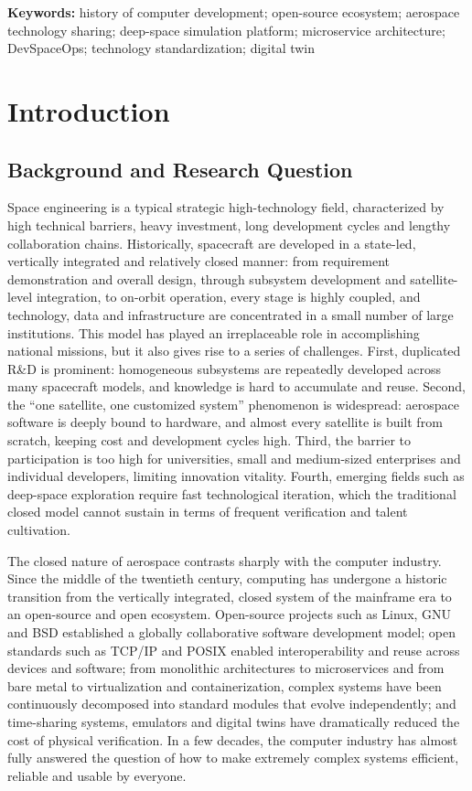 \documentclass[11pt]{article}
\begin{document}
\noindent\textbf{Keywords:} history of computer development; open-source ecosystem; aerospace technology sharing; deep-space simulation platform; microservice architecture; DevSpaceOps; technology standardization; digital twin

\section{Introduction}
\subsection{Background and Research Question}
Space engineering is a typical strategic high-technology field, characterized by high technical barriers, heavy investment, long development cycles and lengthy collaboration chains. Historically, spacecraft are developed in a state-led, vertically integrated and relatively closed manner: from requirement demonstration and overall design, through subsystem development and satellite-level integration, to on-orbit operation, every stage is highly coupled, and technology, data and infrastructure are concentrated in a small number of large institutions. This model has played an irreplaceable role in accomplishing national missions, but it also gives rise to a series of challenges. First, duplicated R\&D is prominent: homogeneous subsystems are repeatedly developed across many spacecraft models, and knowledge is hard to accumulate and reuse. Second, the ``one satellite, one customized system'' phenomenon is widespread: aerospace software is deeply bound to hardware, and almost every satellite is built from scratch, keeping cost and development cycles high. Third, the barrier to participation is too high for universities, small and medium-sized enterprises and individual developers, limiting innovation vitality. Fourth, emerging fields such as deep-space exploration require fast technological iteration, which the traditional closed model cannot sustain in terms of frequent verification and talent cultivation.

The closed nature of aerospace contrasts sharply with the computer industry. Since the middle of the twentieth century, computing has undergone a historic transition from the vertically integrated, closed system of the mainframe era to an open-source and open ecosystem. Open-source projects such as Linux, GNU and BSD established a globally collaborative software development model; open standards such as TCP/IP and POSIX enabled interoperability and reuse across devices and software; from monolithic architectures to microservices and from bare metal to virtualization and containerization, complex systems have been continuously decomposed into standard modules that evolve independently; and time-sharing systems, emulators and digital twins have dramatically reduced the cost of physical verification. In a few decades, the computer industry has almost fully answered the question of how to make extremely complex systems efficient, reliable and usable by everyone.
\end{document}
